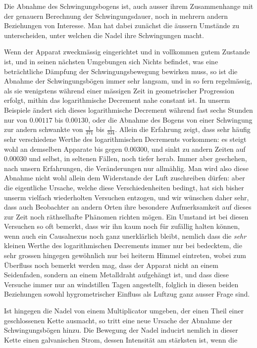 Die Abnahme des Schwingungsbogens ist, auch ausser ihrem Zusammenhange mit der genauern Berechnung der Schwingungsdauer, noch in mehrern andern Beziehungen von Interesse. Man hat dabei zunächst die äussern Umstände zu unterscheiden, unter welchen die Nadel ihre Schwingungen macht.

\par\clearpage
{}
Wenn der Apparat zweckmässig eingerichtet und in vollkommen gutem Zustande ist, und in seinen nächsten Umgebungen sich Nichts befindet, was eine beträchtliche Dämpfung der Schwingungsbewegung bewirken muss, so ist die Abnahme der Schwingungsbögen immer sehr langsam, und in so fern regelmässig, als sie wenigstens während einer mässigen Zeit in geometrischer Progression erfolgt, mithin das logarithmische Decrement nahe constant ist. In unserm Beispiele ändert sich dieses logarithmische Decrement während fast sechs Stunden nur von $0.00117$ bis $0.00130$, oder die Abnahme des Bogens von einer Schwingung zur andern schwankte von $\tfrac1{371}$ bis $\tfrac1{334}$. Allein die Erfahrung zeigt, dass sehr häufig sehr verschiedene Werthe des logarithmischen Decrements vorkommen: es steigt wohl an demselben Apparate bis gegen $0.00300$, und sinkt zu andern Zeiten auf $0.00030$ und selbst, in seltenen Fällen, noch tiefer herab. Immer aber geschehen, nach unsern Erfahrungen, die Veränderungen nur allmählig. Man wird also diese Abnahme nicht wohl allein dem Widerstande der Luft zuschreiben dürfen: aber die eigentliche Ursache, welche diese Verschiedenheiten bedingt, hat sich bisher unserm vielfach wiederholten Versuchen entzogen, und wir wünschen daher sehr, dass auch Beobachter an andern Orten ihre besondere Aufmerksamkeit auf dieses zur Zeit noch räthselhafte Phänomen richten mögen. Ein Umstand ist bei diesen Versuchen so oft bemerkt, dass wir ihn kaum noch für zufällig halten können, wenn auch ein Causalnexus noch ganz unerklärlich bleibt, nemlich dass die \textit{sehr} kleinen Werthe des logarithmischen Decrements immer nur bei bedecktem, die sehr grossen hingegen gewöhnlich nur bei heiterm Himmel eintreten, wobei zum Überfluss noch bemerkt werden mag, dass der Apparat nicht an einem Seidenfaden, sondern an einem Metalldraht aufgehängt ist, und dass diese Versuche immer nur an windstillen Tagen angestellt, folglich in diesen beiden Beziehungen sowohl hygrometrischer Einfluss als Luftzug ganz ausser Frage sind.

Ist hingegen die Nadel von einem Multiplicator umgeben, der einen Theil einer geschlossenen Kette ausmacht, so tritt eine neue Ursache der Abnahme der Schwingungsbögen hinzu. Die Bewegung der Nadel inducirt nemlich in dieser Kette einen galvanischen Strom, dessen Intensität am stärksten ist, wenn die

\par{}\clearpage
